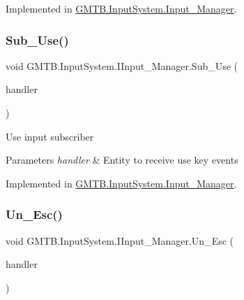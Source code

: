 Implemented in \mbox{\hyperlink{class_g_m_t_b_1_1_input_system_1_1_input___manager_a44d48f4c8117d99c53bed41b4baa08fd}{G\+M\+T\+B.\+Input\+System.\+Input\+\_\+\+Manager}}.

\mbox{\label{interface_g_m_t_b_1_1_input_system_1_1_i_input___manager_aabf7ae758c992a439b018f2c10937b90}} 
\subsubsection{\texorpdfstring{Sub\_Use()}{Sub\_Use()}}
{\footnotesize\ttfamily void G\+M\+T\+B.\+Input\+System.\+I\+Input\+\_\+\+Manager.\+Sub\+\_\+\+Use (\begin{DoxyParamCaption}\item[{Event\+Handler$<$ \mbox{\hyperlink{class_g_m_t_b_1_1_input_system_1_1_input_event}{Input\+Event}} $>$}]{handler }\end{DoxyParamCaption})}



Use input subscriber 


\begin{DoxyParams}{Parameters}
{\em handler} & Entity to receive use key events\\
\hline
\end{DoxyParams}


Implemented in \mbox{\hyperlink{class_g_m_t_b_1_1_input_system_1_1_input___manager_a52bf5b862a2139cb93b08dd3d68ff4cc}{G\+M\+T\+B.\+Input\+System.\+Input\+\_\+\+Manager}}.

\mbox{\label{interface_g_m_t_b_1_1_input_system_1_1_i_input___manager_af635a3053e7dc57db847c9c98b122547}} 
\subsubsection{\texorpdfstring{Un\_Esc()}{Un\_Esc()}}
{\footnotesize\ttfamily void G\+M\+T\+B.\+Input\+System.\+I\+Input\+\_\+\+Manager.\+Un\+\_\+\+Esc (\begin{DoxyParamCaption}\item[{Event\+Handler$<$ \mbox{\hyperlink{class_g_m_t_b_1_1_input_system_1_1_input_event}{Input\+Event}} $>$}]{handler }\end{DoxyParamCaption})}



